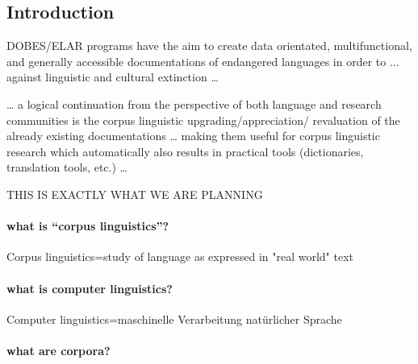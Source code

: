 \documentclass[a4paper,12pt]{article}
\begin{document}
\subsection{Introduction}

DOBES/ELAR programs have the aim to create data orientated, multifunctional, and generally accessible documentations of endangered languages in order to ... against linguistic and cultural extinction … 
 
… a logical continuation from the perspective of both language and research communities is the corpus linguistic upgrading/appreciation/
revaluation of the already existing documentations … making them useful for corpus linguistic research which automatically also results in practical tools (dictionaries, translation tools, etc.) …

THIS IS EXACTLY WHAT WE ARE PLANNING

\paragraph{what is “corpus linguistics”?} Corpus linguistics=study of language as expressed in "real world" text

\paragraph{what is computer linguistics?} Computer linguistics=maschinelle Verarbeitung natürlicher Sprache

\paragraph{what are corpora?}
\end{document}
